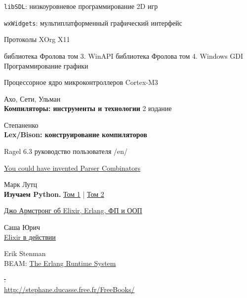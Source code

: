 \begin{thebibliography}{99}
    \secup


 \verb|libSDL|: низкоуровневое программирование 2D игр

 \verb|wxWidgets|: мультиплатформенный графический интерфейс

\secrel{\lin}

 Протоколы XOrg X11

\secrel{\win}

библиотека Фролова том 3. WinAPI
библиотека Фролова том 4. Windows GDI Программирование графики


 Процессорное ядро микроконтроллеров Cortex-M3


 Ахо, Сети, Ульман\\
\textbf{Компиляторы: инструменты и технологии} 2 издание

Степаненко\\
\textbf{Lex/Bison: конструирование компиляторов}

Ragel 6.3 руководство пользователя /en/

\href{http://theorangeduck.com/page/you-could-have-invented-parser-combinators}{You could have invented Parser Combinators}

\secrel{\py}

Марк Лутц\\
\textbf{Изучаем Python.}
\href{https://www.ozon.ru/context/detail/id/156082566/}{Том 1} |
\href{https://www.ozon.ru/context/detail/id/165524776/}{Том 2}

\secrel{\erl/\ex}

\href{https://habr.com/ru/post/450508/}{Джо Армстронг об Elixir, Erlang, ФП и ООП}

Саша Юрич\\
\href{https://www.ozon.ru/context/detail/id/164833016/}{Elixir в действии}

Erik Stenman\\
BEAM:
\href{https://blog.stenmans.org/theBeamBook/}{The Erlang Runtime System}

\secrel{\st}

\st:\\
\url{http://stephane.ducasse.free.fr/FreeBooks/}


\end{thebibliography}
